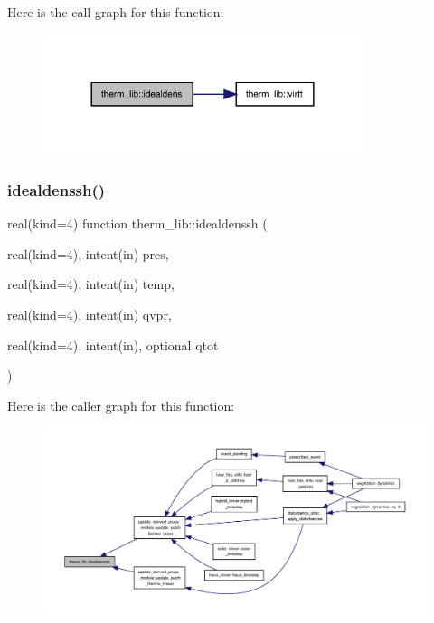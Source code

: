 Here is the call graph for this function\+:
\nopagebreak
\begin{figure}[H]
\begin{center}
\leavevmode
\includegraphics[width=264pt]{namespacetherm__lib_a5a9775d62adebc1ad0473596c7f51649_cgraph}
\end{center}
\end{figure}
\mbox{\label{namespacetherm__lib_a60b714e3ae5457604df59afaf6904acd}} 
\subsubsection{\texorpdfstring{idealdenssh()}{idealdenssh()}}
{\footnotesize\ttfamily real(kind=4) function therm\+\_\+lib\+::idealdenssh (\begin{DoxyParamCaption}\item[{real(kind=4), intent(in)}]{pres,  }\item[{real(kind=4), intent(in)}]{temp,  }\item[{real(kind=4), intent(in)}]{qvpr,  }\item[{real(kind=4), intent(in), optional}]{qtot }\end{DoxyParamCaption})}

Here is the caller graph for this function\+:
\nopagebreak
\begin{figure}[H]
\begin{center}
\leavevmode
\includegraphics[width=350pt]{namespacetherm__lib_a60b714e3ae5457604df59afaf6904acd_icgraph}
\end{center}
\end{figure}
\mbox{\label{namespacetherm__lib_a0b1c333335dfb4af1c56bc56a0e45440}} 
